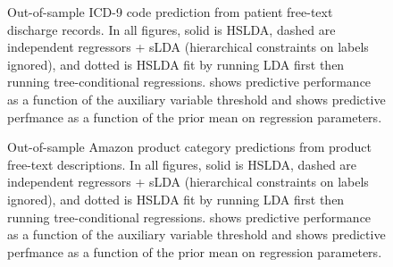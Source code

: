 \begin{figure}[htbp]
\begin{center}
\caption{Out-of-sample ICD-9 code prediction from patient free-text discharge records.  
In all figures, solid is HSLDA, dashed are independent regressors + sLDA (hierarchical 
constraints on labels ignored), and dotted is HSLDA fit by running LDA first then running 
tree-conditional regressions. \subref{} shows predictive performance as a function of the 
auxiliary variable threshold and  shows predictive perfmance as a function of the
prior mean on regression parameters.}
\label{fig:main_clinical_results}
\end{center}
\end{figure}

\begin{figure}[htbp]
\begin{center}
\caption{Out-of-sample Amazon product category predictions from product free-text descriptions.  
In all figures, solid is HSLDA, dashed are independent regressors + sLDA (hierarchical constraints 
on labels ignored), and dotted is HSLDA fit by running LDA first then running tree-conditional 
regressions. \subref{} shows predictive performance as a function of the 
auxiliary variable threshold and  shows predictive perfmance as a function of the
prior mean on regression parameters.}
\label{fig:main_amazon_results}
\end{center}
\end{figure}
